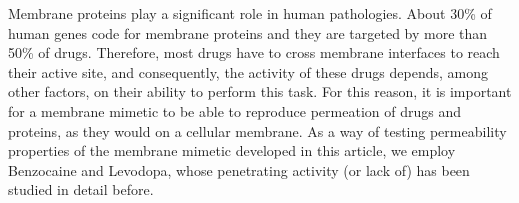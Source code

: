 \documentclass[3p,preprint,review]{elsarticle}
\begin{document}
	Membrane proteins play a significant role in human
	pathologies\cite{Birnbaumer1999,Gillet2010}. About 30\% of human genes code for
	membrane proteins\cite{Fagerberg2010} and they are targeted by more than 50\%
	of
	drugs\cite{Warr1986,Wallin2008}. Therefore, most drugs have to cross membrane
	interfaces to reach their active site, and consequently, the activity of these
	drugs depends, among other factors, on their ability to perform this task. For
	this reason, it is important for a membrane mimetic to be able to reproduce
	permeation of drugs and proteins, as they would on a cellular membrane. As a
	way
	of testing permeability properties of the membrane mimetic developed in this
	article, we employ Benzocaine
	and Levodopa, whose penetrating activity (or lack of) has been studied in
	detail before.\\
	
	
	
\end{document}

